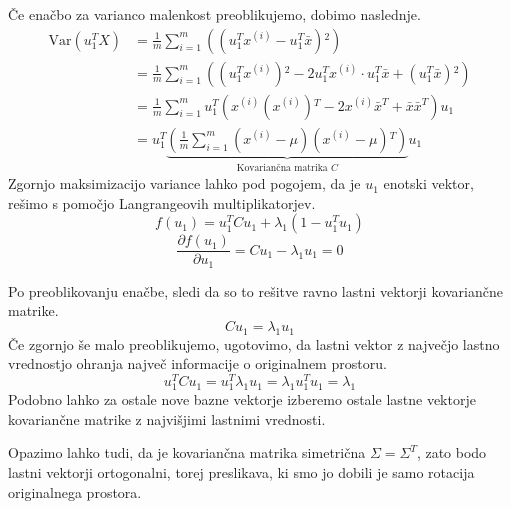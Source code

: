 Če enačbo za varianco malenkost preoblikujemo, dobimo naslednje.~\cite{zupan2024uozp}
\begin{equation}
  \begin{aligned}
    \mathrm{Var}(u_1^T X)
     & = \frac{1}{m} \sum_{i=1}^{m} \left( (u_1^T x^{(i)} - u_1^T \bar{x}){}^2 \right)                                                       \\
     & = \frac{1}{m} \sum_{i=1}^{m} \left( (u_1^T x^{(i)}){}^2 - 2 u_1^T x^{(i)} \cdot u_1^T \bar{x} + (u_1^T \bar{x}){}^2 \right)           \\
     & = \frac{1}{m} \sum_{i=1}^{m} u_1^T \left( x^{(i)} (x^{(i)}){}^T - 2 x^{(i)} \bar{x}^T + \bar{x} \bar{x}^T \right) u_1                 \\
     & = u_1^T \underbrace{\left( \frac{1}{m} \sum_{i=1}^{m} (x^{(i)} - \mu)(x^{(i)} - \mu){}^T \right)}_{\text{Kovariančna matrika } C} u_1
  \end{aligned}
\end{equation}
Zgornjo maksimizacijo variance lahko pod pogojem, da je $u_1$ enotski vektor, rešimo s pomočjo Langrangeovih multiplikatorjev.
\begin{equation}
  f(u_1) = u_1^T C u_1 + \lambda_1 (1 - u_1^T u_1)
\end{equation}
\begin{equation}
  \frac{\partial f(u_1)}{\partial u_1} = C u_1 - \lambda_1 u_1 = 0
\end{equation}

Po preoblikovanju enačbe, sledi da so to rešitve ravno lastni vektorji kovariančne matrike.
\begin{equation}
  C u_1 = \lambda_1 u_1
\end{equation}
Če zgornjo še malo preoblikujemo, ugotovimo, da lastni vektor z največjo lastno vrednostjo ohranja največ informacije o originalnem prostoru.
\begin{equation}
  u_1^T C u_1 = u_1^T \lambda_1 u_1 = \lambda_1 u_1^T u_1 = \lambda_1
\end{equation}
Podobno lahko za ostale nove bazne vektorje izberemo ostale lastne vektorje kovariančne matrike z najvišjimi lastnimi vrednosti.

Opazimo lahko tudi, da je kovariančna matrika simetrična $\Sigma = \Sigma^T$, zato bodo lastni vektorji ortogonalni, torej preslikava, ki smo jo dobili je samo rotacija originalnega prostora.

